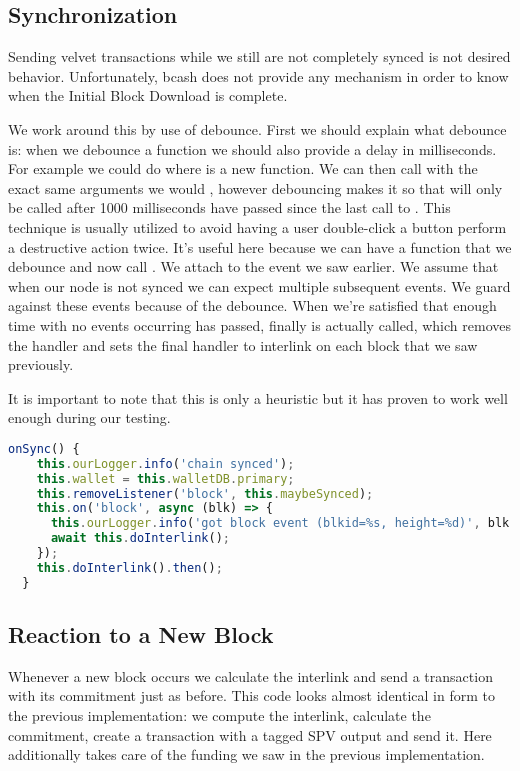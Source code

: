 \subsection{Synchronization}
Sending velvet transactions while we still are not completely synced is not desired behavior. Unfortunately, bcash does not provide any mechanism in order to know when the Initial Block Download is complete.

We work around this by use of debounce. First we should explain what debounce is: when we debounce a function  we should also provide a delay in milliseconds. For example we could do  where  is a new function. We can then call  with the exact same arguments we would , however debouncing makes it so that  will only be called after 1000 milliseconds have passed since the last call to . This technique is usually utilized to avoid having a user double-click a button perform a destructive action twice. It's useful here because we can have a function  that we debounce and now call . We attach  to the  event we saw earlier. We assume that when our node is not synced we can expect multiple subsequent  events. We guard against these events because of the debounce. When we're satisfied that enough time with no events occurring has passed, finally  is actually called, which removes the  handler and sets the final handler to interlink on each block that we saw previously.

It is important to note that this is only a heuristic but it has proven to work well enough during our testing.

\begin{lstlisting}[language=js]
  onSync() {
    this.ourLogger.info('chain synced');
    this.wallet = this.walletDB.primary;
    this.removeListener('block', this.maybeSynced);
    this.on('block', async (blk) => {
      this.ourLogger.info('got block event (blkid=%s, height=%d)', blk.rhash(), blk.height);
      await this.doInterlink();
    });
    this.doInterlink().then();
  }
\end{lstlisting}

\subsection{Reaction to a New Block}

Whenever a new block occurs we calculate the interlink and send a transaction with its commitment just as before. This code looks almost identical in form to the previous implementation: we compute the interlink, calculate the commitment, create a transaction with a tagged SPV output and send it. Here  additionally takes care of the funding we saw in the previous implementation.

